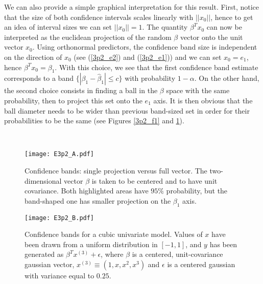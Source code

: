We can also provide a simple graphical interpretation for this result. First, notice that the size of both confidence
intervals scales linearly with $||x_0||$, hence to get an idea of interval sizes we can set $||x_0|| = 1$.
The quantity $\beta^T x_0$ can now be interpreted as the euclidean projection of the random $\beta$ vector
onto the unit vector $x_0$. Using orthonormal predictors, the confidence band size is independent on the direction
of $x_0$ (see (\ref{3p2_e2}) and (\ref{3p2_e1})) and we can set $x_0 = e_1$, hence $\beta^T x_0 = \beta_1$. With this
choice, we see that the first confidence band estimate corresponds to a band $\{|\beta_1 - \hat{\beta}_1| \leq c \}$ with probability $1 - \alpha$. On the other hand, the second choice consists in finding a ball in the $\beta$ space with the same probability, then to project this set onto the $e_1$ axis. It is then obvious that the ball diameter needs
to be wider than  previous band-sized set in order for their probabilities to be the same (see Figures \ref{3p2_f1} and \ref{3p2_f2}).

\hspace{0.5cm}\\
\begin{figure}
    \begin{minipage}{\half}
        \texttt{[image: E3p2\_A.pdf]} \caption{Confidence bands: single projection versus full vector.
            The two-dimensional vector $\beta$ is taken to be centered and to have unit covariance. Both highlighted areas
            have $95\%$ probability, but the band-shaped one has smaller projection on the $\beta_1$ axis. \label{3p2_f1}}
        
    \end{minipage}\halfspace
    \begin{minipage}{\half}
        \texttt{[image: E3p2\_B.pdf]} \caption{Confidence bands for a cubic univariate model. Values of $x$ have
            been drawn from a uniform distribution in $[-1, 1]$, and $y$ has been generated as $\beta^T x^{(3)} + \epsilon$,
            where $\beta$ is a centered, unit-covariance gaussian vector, $x^{(3)} \equiv (1, x, x^2, x^3)$ and $\epsilon$
            is a centered gaussian with variance equal to $0.25$. \label{3p2_f2}}
    \end{minipage}
\end{figure}
